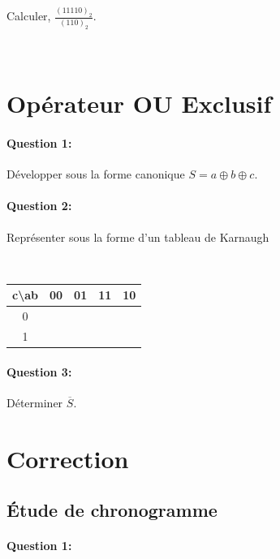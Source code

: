 Calculer, $\frac{(11110)_{2}}{(110)_{2}}$.

~\

\section{Opérateur OU Exclusif}

\paragraph{Question 1:}

Développer sous la forme canonique $S= a \oplus b \oplus c$.

\paragraph{Question 2:}

Représenter sous la forme d'un tableau de Karnaugh

~\

\begin{center}
\begin{tabular}{|c|c|c|c|c|}
\hline
c\textbackslash ab & 00 & 01 & 11 & 10 \\
\hline
0  &    &    &    &    \\
\hline
1  &    &    &    & \\
\hline
\end{tabular} 
\end{center}

\paragraph{Question 3:}

Déterminer $\overline{S}$.

\clearpage

\ifdef{\public}{}{}

\newpage

\pagestyle{correction}

\section{Correction}

\subsection{Étude de chronogramme}

\paragraph{Question 1:}

